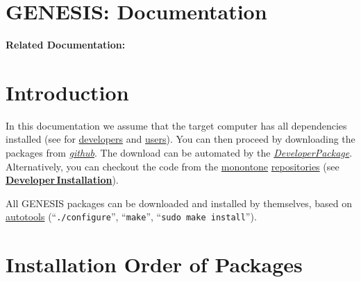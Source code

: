 \documentclass[12pt]{article}
\begin{document}
\section*{GENESIS: Documentation}

{\bf Related Documentation:}

\section*{Introduction}

In this documentation we assume that the target computer has all
dependencies installed (see for
\href{../installation-developer/installation-developer.tex}{developers}
and \href{../installation-debian/installation-debian.tex}{users}). You can
then proceed by downloading the packages from
\href{https://github.com/HugoCornelis/}{{\it github}}.
The download can be automated by the
\href{../developer-package/developer-package.tex}{\it DeveloperPackage}. Alternatively, you can checkout the code from the
\href{http://monotone.ca/}{monontone}
\href{../developer-intro/developer-intro.tex}{repositories} (see \href{../installation-developer/installation-developer.tex}{\bf Developer\,Installation}).

All GENESIS packages can be downloaded and installed by themselves,
based on \href{http://www.gnu.org/software/autoconf/}{autotools}
(``{\tt ./configure}'', ``{\tt make}'', ``{\tt sudo make install}'').



\section*{Installation Order of Packages}
\end{document}
